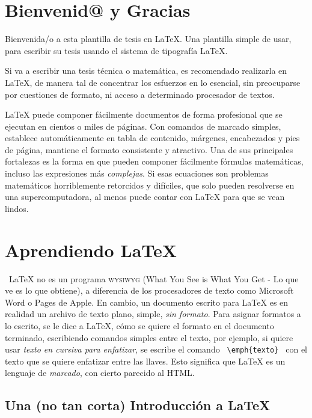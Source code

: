 \section{Bienvenid@ y Gracias}
Bienvenida/o a esta plantilla de tesis en \LaTeX{}. Una plantilla simple de usar, para escribir su tesis usando el sistema de tipografía \LaTeX. 

Si va a escribir una tesis técnica o matemática, es recomendado realizarla en \LaTeX{}, de manera tal de concentrar los esfuerzos en lo esencial, sin preocuparse por cuestiones de formato, ni acceso a determinado procesador de textos.

\LaTeX{} puede componer fácilmente documentos de forma profesional que se ejecutan en cientos o miles de páginas. Con comandos de marcado simples, establece automáticamente en tabla de contenido,  márgenes, encabezados y pies de página, mantiene el formato consistente y atractivo. Una de sus principales fortalezas es la forma en que pueden componer fácilmente  fórmulas  matemáticas, incluso las expresiones más \emph{complejas}. Si esas ecuaciones son  problemas matemáticos  horriblemente retorcidos y difíciles, que solo pueden resolverse en una supercomputadora, al menos puede contar con \LaTeX{} para que se vean lindos.


\section{Aprendiendo \LaTeX{}}

\ LaTeX {} no es un programa \textsc{wysiwyg} (What You See is What You Get - Lo que ve es lo que obtiene), a diferencia de los procesadores de texto como Microsoft Word o Pages de Apple. En cambio, un documento escrito para \LaTeX{} es en realidad un archivo de texto plano, simple, \emph {sin formato}. Para asignar formatos a lo escrito, se le dice a \LaTeX{}, cómo se quiere el formato en el documento terminado, escribiendo comandos simples entre el texto, por ejemplo, si quiere usar \emph{texto en cursiva para enfatizar}, se escribe el comando \verb | \emph{texto} |  con el texto que se quiere enfatizar  entre las llaves. Esto significa que \LaTeX{} es un lenguaje de \textit{marcado}, con cierto parecido  al HTML.



\subsection{Una (no tan corta) Introducción a \LaTeX{}}

